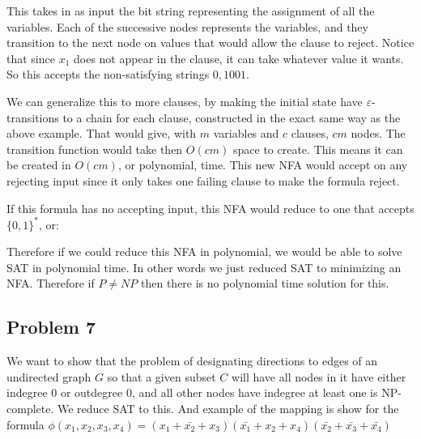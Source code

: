 \documentclass[english]{article}
\begin{document}
This takes in as input the bit string representing the assignment of all the variables. Each of the successive nodes
represents the variables, and they transition to the next node on values that would allow the clause to reject.
Notice that since $x_1$ does not appear in the clause, it can take whatever value it wants. So this accepts
the non-satisfying strings ${0,1}001$. 

We can generalize this to more clauses, by making the initial state have $\varepsilon$-transitions 
to a chain for each clause, constructed in the exact same way as the above example. That would
give, with $m$ variables and $c$ clauses, $cm$ nodes. The transition function would take then
$O(cm)$ space to create. This means it can be created in $O(cm)$, or polynomial, time.
This new NFA would accept on any rejecting input since it only takes one failing clause to make the formula
reject. 

If this formula has no accepting input, this NFA would reduce to one that accepts $\{0,1\}^*$, or:


Therefore if we could reduce this NFA in polynomial, we would be able to solve SAT in polynomial time. In other
words we just reduced SAT to minimizing an NFA. Therefore if $P\neq NP$ then there is no polynomial time solution
for this.

\subsection*{Problem 7}
We want to show that the problem of designating directions to edges of an undirected graph $G$ so that a given subset
$C$ will have all nodes in it have either indegree 0 or outdegree 0, and all other nodes have indegree at least one
is NP-complete. We reduce SAT to this. And example of the mapping is show for the formula
$\phi(x_1,x_2,x_3,x_4) = (x_1 + \bar{x_2} + x_3)(\bar{x_1} + x_2 + x_4)(\bar{x_2} + \bar{x_3} + \bar{x_4})$
\end{document}
